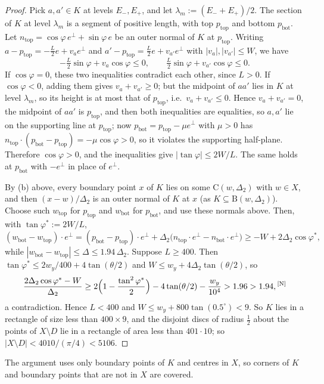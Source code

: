 \documentclass[11pt]{amsart}
\theoremstyle{definition}
\theoremstyle{remark}
\newcommand{\Dt}{\Delta_2}
\newcommand{\Cc}{\mathrm{C}}      %
\newcommand{\Dd}{\mathrm{B}}      %
\newcommand{\chk}[1]{\textsuperscript{[#1]}}
\begin{document}
\begin{proof}
Pick $a,a'\in K$ at levels $E_-,E_+$, and let $\lambda_m:=(E_-+E_+)/2$. The section of $K$ at level $\lambda_m$ is a segment of positive length, with top $p_{\mathrm{top}}$ and bottom $p_{\mathrm{bot}}$. Let $n_{\mathrm{top}}=\cos\varphi\,e^\perp+\sin\varphi\,e$ be an outer normal of $K$ at $p_{\mathrm{top}}$. Writing $a-p_{\mathrm{top}}=-\frac L2e+v_ae^\perp$ and $a'-p_{\mathrm{top}}=\frac L2e+v_{a'}e^\perp$ with $|v_a|,|v_{a'}|\le W$, we have
\[
-\tfrac L2\sin\varphi+v_a\cos\varphi\le0,\qquad \tfrac L2\sin\varphi+v_{a'}\cos\varphi\le0 .
\]
If $\cos\varphi=0$, these two inequalities contradict each other, since $L>0$. If $\cos\varphi<0$, adding them gives $v_a+v_{a'}\ge0$; but the midpoint of $aa'$ lies in $K$ at level $\lambda_m$, so its height is at most that of $p_{\mathrm{top}}$, i.e.\ $v_a+v_{a'}\le0$. Hence $v_a+v_{a'}=0$, the midpoint of $aa'$ is $p_{\mathrm{top}}$, and then both inequalities are equalities, so $a,a'$ lie on the supporting line at $p_{\mathrm{top}}$; now $p_{\mathrm{bot}}=p_{\mathrm{top}}-\mu e^\perp$ with $\mu>0$ has $n_{\mathrm{top}}\cdot(p_{\mathrm{bot}}-p_{\mathrm{top}})=-\mu\cos\varphi>0$, so it violates the supporting half-plane. Therefore $\cos\varphi>0$, and the inequalities give $|\tan\varphi|\le2W/L$. The same holds at $p_{\mathrm{bot}}$ with $-e^\perp$ in place of $e^\perp$.

By (b) above, every boundary point $x$ of $K$ lies on some $\Cc(w,\Dt)$ with $w\in X$, and then $(x-w)/\Dt$ is an outer normal of $K$ at $x$ (as $K\subseteq\Dd(w,\Dt)$). Choose such $w_{\mathrm{top}}$ for $p_{\mathrm{top}}$ and $w_{\mathrm{bot}}$ for $p_{\mathrm{bot}}$, and use these normals above. Then, with $\tan\varphi^*:=2W/L$,
\[
(w_{\mathrm{bot}}-w_{\mathrm{top}})\cdot e^\perp=(p_{\mathrm{bot}}-p_{\mathrm{top}})\cdot e^\perp+\Dt\bigl(n_{\mathrm{top}}\cdot e^\perp-n_{\mathrm{bot}}\cdot e^\perp\bigr)\ge-W+2\Dt\cos\varphi^*,
\]
while $|w_{\mathrm{bot}}-w_{\mathrm{top}}|\le\Delta\le1.94\,\Dt$. Suppose $L\ge400$. Then $\tan\varphi^*\le2w_y/400+4\tan(\theta/2)$ and $W\le w_y+4\Dt\tan(\theta/2)$, so
\[
\frac{2\Dt\cos\varphi^*-W}{\Dt}\ge2\Bigl(1-\frac{\tan^2\varphi^*}{2}\Bigr)-4\tan(\theta/2)-\frac{w_y}{10^4}>1.96>1.94,\chk{N}
\]
a contradiction. Hence $L<400$ and $W\le w_y+800\tan(0.5^\circ)<9$. So $K$ lies in a rectangle of size less than $400\times9$, and the disjoint discs of radius $\frac12$ about the points of $X\setminus D$ lie in a rectangle of area less than $401\cdot10$; so $|X\setminus D|<4010/(\pi/4)<5106$.
\end{proof}
The argument uses only boundary points of $K$ and centres in $X$, so corners of $K$ and boundary points that are not in $X$ are covered.
\end{document}
